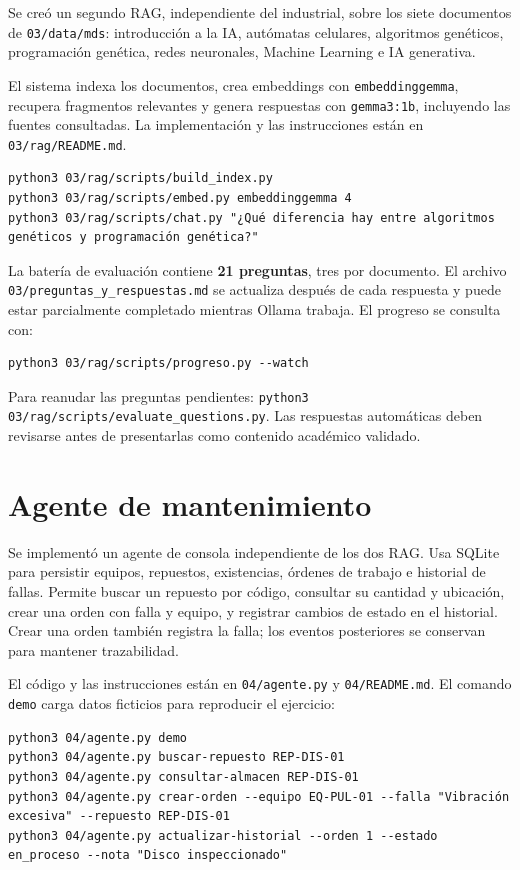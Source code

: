 \documentclass[14pt,twoside]{article}
\begin{document}
Se creó un segundo RAG, independiente del industrial, sobre los siete documentos de \texttt{03/data/mds}: introducción a la IA, autómatas celulares, algoritmos genéticos, programación genética, redes neuronales, Machine Learning e IA generativa.

El sistema indexa los documentos, crea embeddings con \texttt{embeddinggemma}, recupera fragmentos relevantes y genera respuestas con \texttt{gemma3:1b}, incluyendo las fuentes consultadas. La implementación y las instrucciones están en \texttt{03/rag/README.md}.

\begin{verbatim}
python3 03/rag/scripts/build_index.py
python3 03/rag/scripts/embed.py embeddinggemma 4
python3 03/rag/scripts/chat.py "¿Qué diferencia hay entre algoritmos genéticos y programación genética?"
\end{verbatim}

La batería de evaluación contiene \textbf{21 preguntas}, tres por documento. El archivo \texttt{03/preguntas\_y\_respuestas.md} se actualiza después de cada respuesta y puede estar parcialmente completado mientras Ollama trabaja. El progreso se consulta con:

\begin{verbatim}
python3 03/rag/scripts/progreso.py --watch
\end{verbatim}

Para reanudar las preguntas pendientes: \texttt{python3 03/rag/scripts/evaluate\_questions.py}. Las respuestas automáticas deben revisarse antes de presentarlas como contenido académico validado.

\section{Agente de mantenimiento}

Se implementó un agente de consola independiente de los dos RAG. Usa SQLite para persistir equipos, repuestos, existencias, órdenes de trabajo e historial de fallas. Permite buscar un repuesto por código, consultar su cantidad y ubicación, crear una orden con falla y equipo, y registrar cambios de estado en el historial. Crear una orden también registra la falla; los eventos posteriores se conservan para mantener trazabilidad.

El código y las instrucciones están en \texttt{04/agente.py} y \texttt{04/README.md}. El comando \texttt{demo} carga datos ficticios para reproducir el ejercicio:

\begin{verbatim}
python3 04/agente.py demo
python3 04/agente.py buscar-repuesto REP-DIS-01
python3 04/agente.py consultar-almacen REP-DIS-01
python3 04/agente.py crear-orden --equipo EQ-PUL-01 --falla "Vibración excesiva" --repuesto REP-DIS-01
python3 04/agente.py actualizar-historial --orden 1 --estado en_proceso --nota "Disco inspeccionado"
\end{verbatim}
\end{document}
